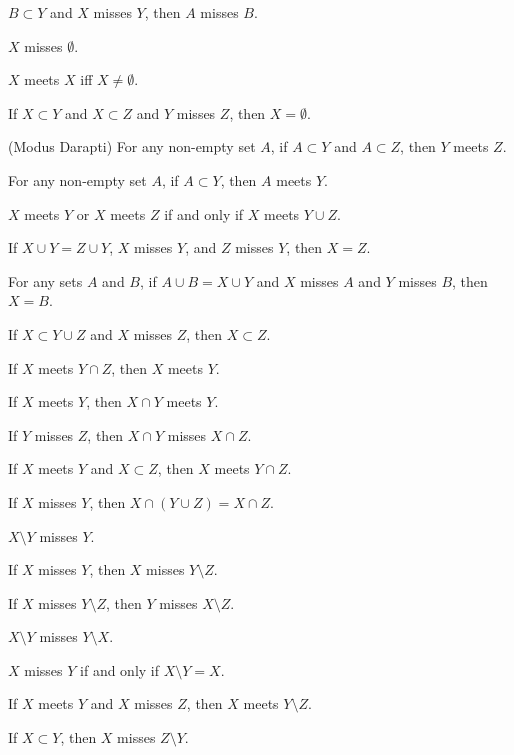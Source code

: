 \begin{thm}
  $B\subset Y$ and $X$ misses $Y$, then $A$ misses $B$.
\item\label{xboole1:65} $X$ misses $\emptyset$.
\item\label{xboole1:66} $X$ meets $X$ iff $X\neq\emptyset$.
\item\label{xboole1:67} If $X\subset Y$ and $X\subset Z$ and $Y$ misses $Z$,
  then $X=\emptyset$.
\item\label{xboole1:68} (Modus Darapti) For any non-empty set $A$,
  if $A\subset Y$ and $A\subset Z$, then $Y$ meets $Z$.
\item\label{xboole1:69} For any non-empty set $A$, if $A\subset Y$, then
  $A$ meets $Y$.
\item\label{xboole1:70} $X$ meets $Y$ or $X$ meets $Z$ if and only if
  $X$ meets $Y\cup Z$.
\item\label{xboole1:71} If $X\cup Y=Z\cup Y$, $X$ misses $Y$, and $Z$
  misses $Y$, then $X=Z$.
\item\label{xboole1:72} For any sets $A$ and $B$, if $A\cup B=X\cup Y$
  and $X$ misses $A$ and $Y$ misses $B$, then $X=B$.
\item\label{xboole1:73} If $X\subset Y\cup Z$ and $X$ misses $Z$, then
  $X\subset Z$.
\item\label{xboole1:74} If $X$ meets $Y\cap Z$, then $X$ meets $Y$.
\item\label{xboole1:75} If $X$ meets $Y$, then $X\cap Y$ meets $Y$.
\item\label{xboole1:76} If $Y$ misses $Z$, then $X\cap Y$ misses $X\cap Z$.
\item\label{xboole1:77} If $X$ meets $Y$ and $X\subset Z$, then $X$
  meets $Y\cap Z$.
\item\label{xboole1:78} If $X$ misses $Y$, then $X\cap(Y\cup Z)=X\cap Z$.
\item\label{xboole1:79} $X\setminus Y$ misses $Y$.
\item\label{xboole1:80} If $X$ misses $Y$, then $X$ misses $Y\setminus Z$.
\item\label{xboole1:81} If $X$ misses $Y\setminus Z$, then $Y$ misses $X\setminus Z$.
\item\label{xboole1:82} $X\setminus Y$ misses $Y\setminus X$.
\item\label{xboole1:83} $X$ misses $Y$ if and only if $X\setminus Y=X$.
\item\label{xboole1:84} If $X$ meets $Y$ and $X$ misses $Z$, then $X$
  meets $Y\setminus Z$.
\item\label{xboole1:85} If $X\subset Y$, then $X$ misses $Z\setminus Y$.

\end{thm}
